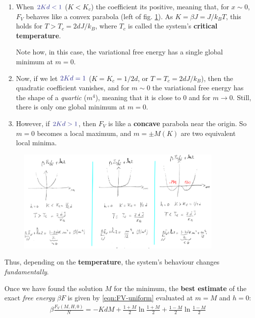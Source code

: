 \documentclass[../../main.tex]{subfiles}
\begin{document}
\begin{enumerate}
    \item When $\textcolor{Blue}{2Kd < 1}$ ($K < K_c$) the coefficient its positive, meaning that, for $x \sim 0$, $F_V$ behaves like a convex parabola (left of fig. \ref{fig:variational_cases}). As $K = \beta J = J/k_B T$, this holds for $T > T_c = 2d J/k_B$, where $T_c$ is called the system's \textbf{critical temperature}. 

    Note how, in this case, the variational free energy has a single global minimum at $m=0$.
    \item Now, if we let $\textcolor{Blue}{2Kd = 1}$ ($K=K_c = 1/2d$, or $T=T_c = 2dJ/k_B$), then the quadratic coefficient vanishes, and for $m \sim 0$ the variational free energy has the shape of a \textit{quartic} ($m^4$), meaning that it is close to $0$ and  for $m \to 0$. Still, there is only one global minimum at $m=0$.
    \item However, if $\textcolor{Blue}{2Kd > 1}$, then $F_V$ is like a \textbf{concave} parabola near the origin. So $m=0$ becomes a local maximum, and $m = \pm M(K)$ are two equivalent local minima. 
\end{enumerate}

\begin{figure}[H]
    \centering
    \includegraphics[width=0.9\textwidth]{variational_cases.png}
    \caption{}
    \label{fig:variational_cases}
\end{figure}

Thus, depending on the \textbf{temperature}, the system's behaviour changes \textit{fundamentally}.  

\medskip

Once we have found the solution $M$ for the minimum, the \textbf{best estimate} of the exact \textit{free energy} $\beta F$ is given by \ref{eqn:FV-uniform} evaluated at $m=M$ and $h=0$:
\begin{align*}
    \beta \frac{F_V(M,H,0)}{N} = -K d M + \frac{1+M}{2} \ln \frac{1+M}{2} + \frac{1-M}{2} \ln \frac{1-M}{2}     
\end{align*}
\end{document}
